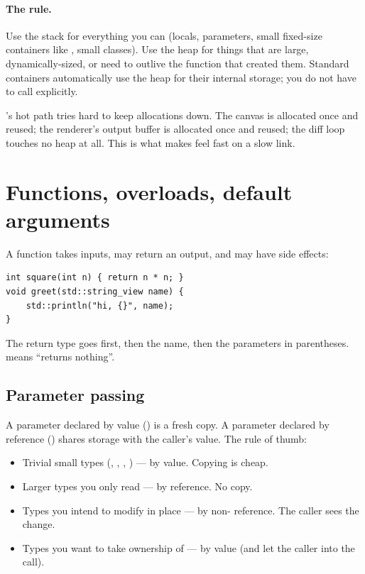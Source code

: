 \paragraph{The rule.}
Use the stack for everything you can (locals, parameters, small
fixed-size containers like , small classes). Use
the heap for things that are large, dynamically-sized, or need to
outlive the function that created them. Standard containers
automatically use the heap for their internal storage; you do not
have to call  explicitly.

\maya{}'s hot path tries hard to keep allocations down. The canvas
is allocated once and reused; the renderer's output buffer is
allocated once and reused; the diff loop touches no heap at all.
This is what makes \maya{} feel fast on a slow link.

\section{Functions, overloads, default arguments}
\label{sec:cpp:functions}

A function takes inputs, may return an output, and may have side
effects:

\begin{lstlisting}
int square(int n) { return n * n; }
void greet(std::string_view name) {
    std::println("hi, {}", name);
}
\end{lstlisting}

The return type goes first, then the name, then the parameters in
parentheses.  means ``returns nothing''.

\subsection{Parameter passing}

A parameter declared by value () is a fresh copy. A
parameter declared by reference () shares storage
with the caller's value. The rule of thumb:

\begin{itemize}[leftmargin=*]
  \item Trivial small types (, ,
    , ) --- by value.
    Copying is cheap.
  \item Larger types you only read --- by  reference.
    No copy.
  \item Types you intend to modify in place --- by non-
    reference. The caller sees the change.
  \item Types you want to take ownership of --- by value (and let
    the caller  into the call).
\end{itemize}

